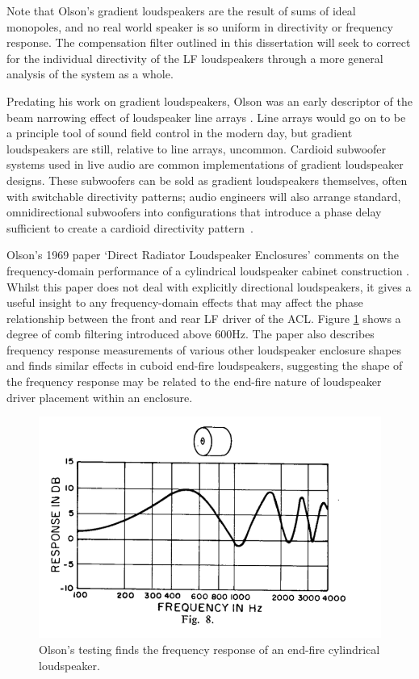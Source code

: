 \documentclass{report}
\begin{document}
        Note that Olson's gradient loudspeakers are the result of sums of ideal monopoles, and no real world speaker is so uniform in directivity or frequency response.
        The compensation filter outlined in this dissertation will seek to correct for the individual directivity of the LF loudspeakers through a more general analysis of the system as a whole.

        Predating his work on gradient loudspeakers, Olson was an early descriptor of the beam narrowing effect of loudspeaker line arrays \cite{olson1957acoustical}.
        Line arrays would go on to be a principle tool of sound field control in the modern day, but gradient loudspeakers are still, relative to line arrays, uncommon.
        Cardioid subwoofer systems used in live audio are common implementations of gradient loudspeaker designs.
        These subwoofers can be sold as gradient loudspeakers themselves, often with switchable directivity patterns; audio engineers will also arrange standard, omnidirectional subwoofers into configurations that introduce a phase delay sufficient to create a cardioid directivity pattern~\cite{curtis2022cardioidsubs}.
        
        Olson's 1969 paper `Direct Radiator Loudspeaker Enclosures' comments on the frequency-domain performance of a cylindrical loudspeaker cabinet construction \cite{olson1969direct}.
        Whilst this paper does not deal with explicitly directional loudspeakers, it gives a useful insight to any frequency-domain effects that may affect the phase relationship between the front and rear LF driver of the ACL.
        Figure \ref{olsonCylinder} shows a degree of comb filtering introduced above 600Hz.
        The paper also describes frequency response measurements of various other loudspeaker enclosure shapes and finds similar effects in cuboid end-fire loudspeakers, suggesting the shape of the frequency response may be related to the end-fire nature of loudspeaker driver placement within an enclosure.
        
        \begin{figure}[H]
            \centering
            \includegraphics[width = 0.7\linewidth]{figs/olsonCylinder.png}
            \caption{Olson's testing finds the frequency response of an end-fire cylindrical loudspeaker.}
            \label{olsonCylinder}
        \end{figure}
\end{document}
